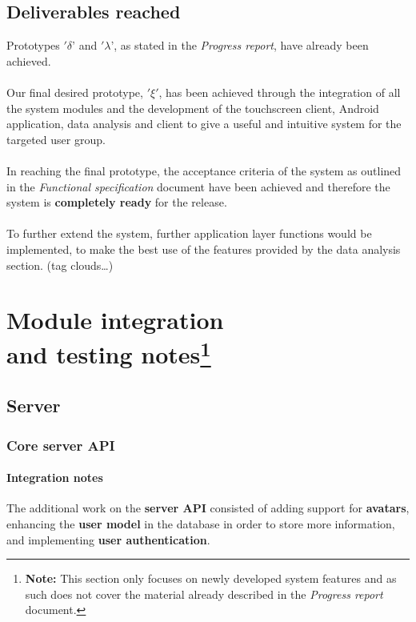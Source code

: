 \documentclass[12p, a4paper, onecolumn]{report}
\begin{document}
\section{Deliverables reached}

Prototypes $'\delta’$ and $'\lambda’$, as stated in the \emph{Progress report}, have already been achieved. \\ \\
Our final desired prototype, $'\xi'$, has been achieved through the integration of all the system modules and the development of the touchscreen client, Android application, data analysis and client to give a useful and intuitive system for the targeted user group. \\ \\
In reaching the final prototype, the acceptance criteria of the system as outlined in the \emph{Functional specification} document have been achieved and therefore the system is \textbf{completely ready} for the release. \\ \\
To further extend the system, further application layer functions would be implemented, to make the best use of the features provided by the data analysis section. (tag clouds\dots)

\chapter[Module integration and testing notes]{Module integration \\ and testing notes\footnote{\textbf{Note:} This section only focuses on newly developed system features and as such does not cover the material already described in the \emph{Progress report} document.}}

\section{Server}

\subsection{Core server API}

\subsubsection{Integration notes}

The additional work on the \textbf{server API} consisted of adding support for \textbf{avatars}, enhancing the \textbf{user model} in the database in order to store more information, and implementing \textbf{user authentication}.
\end{document}

